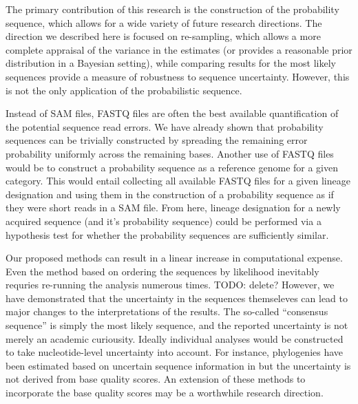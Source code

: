 \documentclass[10pt]{article}
\begin{document}
The primary contribution of this research is the construction of the probability sequence, which allows for a wide variety of future research directions.
The direction we described here is focused on re-sampling, which allows a more complete appraisal of the variance in the estimates (or provides a reasonable prior distribution in a Bayesian setting), while comparing results for the most likely sequences provide a measure of robustness to sequence uncertainty.
However, this is not the only application of the probabilistic sequence.

Instead of SAM files, FASTQ files are often the best available quantification of the potential sequence read errors. 
We have already shown that probability sequences can be trivially constructed by spreading the remaining error probability uniformly across the remaining bases.
Another use of FASTQ files would be to construct a probability sequence as a reference genome for a given category.
This would entail collecting all available FASTQ files for a given lineage designation and using them in the construction of a probability sequence as if they were short reads in a SAM file.
From here, lineage designation for a newly acquired sequence (and it's probability sequence) could be performed via a hypothesis test for whether the probability sequences are sufficiently similar.

Our proposed methods can result in a linear increase in computational expense.
Even the method based on ordering the sequences by likelihood inevitably requries re-running the analysis numerous times. TODO: delete?
However, we have demonstrated that the uncertainty in the sequences themseleves can lead to major changes to the interpretations of the results.
The so-called ``consensus sequence'' is simply the most likely sequence, and the reported uncertainty is not merely an academic curiousity.
Ideally individual analyses would be constructed to take nucleotide-level uncertainty into account.
For instance, phylogenies have been estimated based on uncertain sequence information in \citet{rossOncoNEMInferringTumor2016, jahnTreeInferenceSinglecell2016, zafarSiFitInferringTumor2017} but the uncertainty is not derived from base quality scores.
An extension of these methods to incorporate the base quality scores may be a worthwhile research direction.
\end{document}
